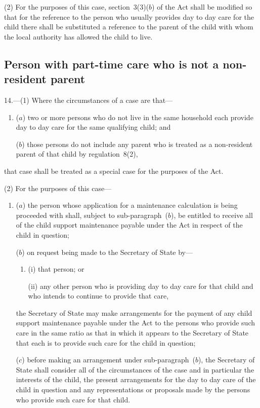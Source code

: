 \documentclass[12pt,a4paper]{article}
\begin{document}
(2) For the purposes of this case, section~3(3)($b$)  of the Act shall be modified so that for the reference to the person who usually provides day to day care for the child there shall be substituted a reference to the parent of the child with whom the local authority 
has allowed the child to live.  %


\subsection[14. Person with part-time care who is not a non-resident parent]{Person with part-time care who is not a non-resident parent}

14.---(1)  Where the circumstances of a case are that—
\begin{enumerate}\item[]
($a$) two or more persons who do not live in the same household each provide day to day care for the same qualifying child; and

($b$) those persons do not include any parent who is treated as a non-resident parent of that child by regulation~8(2),
\end{enumerate}
that case shall be treated as a special case for the purposes of the Act.

(2) For the purposes of this case—
\begin{enumerate}\item[]
($a$) the person whose application for a maintenance calculation is being proceeded with shall, subject to sub-paragraph~($b$), be entitled to receive all of the child support maintenance payable under the Act in respect of the child in question;

($b$) on request being made to the Secretary of State by—
\begin{enumerate}\item[]
(i) that person; or

(ii) any other person who is providing day to day care for that child and who intends to continue to provide that care,
\end{enumerate}
the Secretary of State may make arrangements for the payment of any child support maintenance payable under the Act to the persons who provide such care in the same ratio as that in which it appears to the Secretary of State that each is to provide such care for the child in question;

($c$) before making an arrangement under sub-paragraph~($b$), the Secretary of State shall consider all of the circumstances of the case and in particular the interests of the child, the present arrangements for the day to day care of the child in question and any representations or proposals made by the persons who provide such care for that child.
\end{enumerate}
\end{document}
